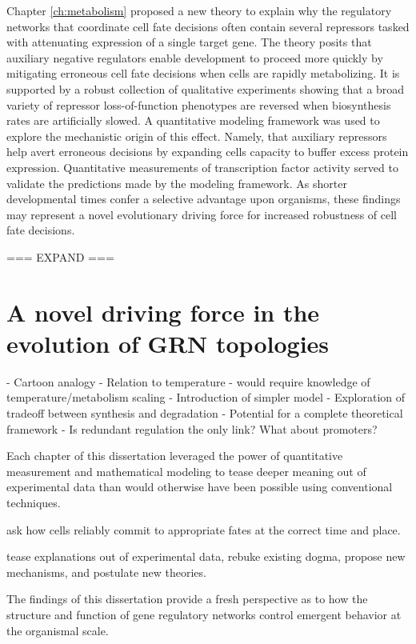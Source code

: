 Chapter \ref{ch:metabolism} proposed a new theory to explain why the regulatory networks that coordinate cell fate decisions often contain several repressors tasked with attenuating expression of a single target gene. The theory posits that auxiliary negative regulators enable development to proceed more quickly by mitigating erroneous cell fate decisions when cells are rapidly metabolizing. It is supported by a robust collection of qualitative experiments showing that a broad variety of repressor loss-of-function phenotypes are reversed when biosynthesis rates are artificially slowed. A quantitative modeling framework was used to explore the mechanistic origin of this effect. Namely, that auxiliary repressors help avert erroneous decisions by expanding cells capacity to buffer excess protein expression. Quantitative measurements of transcription factor activity served to validate the predictions made by the modeling framework. As shorter developmental times confer a selective advantage upon organisms, these findings may represent a novel evolutionary driving force for increased robustness of cell fate decisions.

=== EXPAND ===




\section{ A novel driving force in the evolution of GRN topologies }

- Cartoon analogy
- Relation to temperature - would require knowledge of temperature/metabolism scaling
- Introduction of simpler model
- Exploration of tradeoff between synthesis and degradation
- Potential for a complete theoretical framework
- Is redundant regulation the only link? What about promoters?





Each chapter of this dissertation leveraged the power of quantitative measurement and mathematical modeling to tease deeper meaning out of experimental data than would otherwise have been possible using conventional techniques.

ask how cells reliably commit to appropriate fates at the correct time and place.

tease explanations out of experimental data, rebuke existing dogma, propose new mechanisms, and postulate new theories. 

The findings of this dissertation provide a fresh perspective as to how the structure and function of gene regulatory networks control emergent behavior at the organismal scale.

